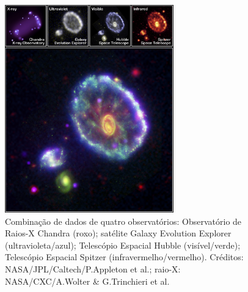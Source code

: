 \begin{figure}[h]
  \centering 
  \includegraphics[width=0.65\textwidth]{Imagens/Cartwheel04.jpg} 
  \caption[Composição de imagens de Cartwheel.]{Combinação de dados de quatro observatórios: Observatório de Raios-X Chandra (roxo); satélite Galaxy Evolution Explorer (ultravioleta/azul); Telescópio Espacial Hubble (visível/verde); Telescópio Espacial Spitzer (infravermelho/vermelho). Créditos: NASA/JPL/Caltech/P.Appleton et al.; raio-X: NASA/CXC/A.Wolter \& G.Trinchieri et al.}
  \label{fig:cart4} 
\end{figure}

